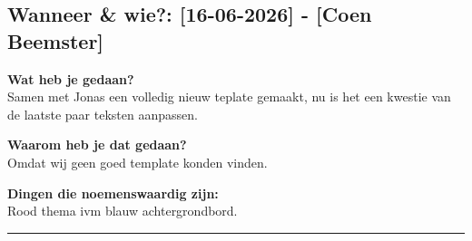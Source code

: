
\subsection*{Wanneer \& wie?: [16-06-2026] - [Coen Beemster]}

\textbf{Wat heb je gedaan?}\\
Samen met Jonas een volledig nieuw teplate gemaakt, nu is het een kwestie van de laatste paar teksten aanpassen.
\vspace{0.3cm} 

\noindent \textbf{Waarom heb je dat gedaan?}\\
Omdat wij geen goed template konden vinden.

\noindent \textbf{Dingen die noemenswaardig zijn:}\\
Rood thema ivm blauw achtergrondbord.


\vspace{0.5cm}
\hrule 
\vspace{0.5cm}
